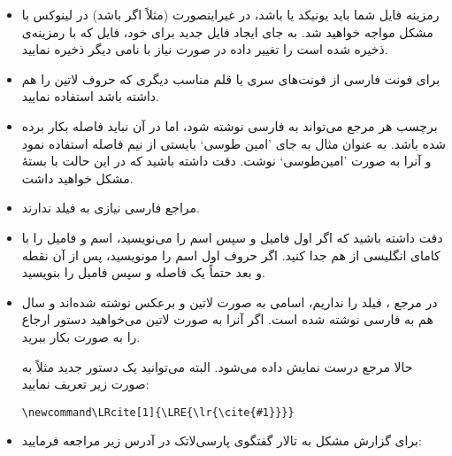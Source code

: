 \documentclass{article}
\theoremstyle{plain}\newtheorem{question}{پرسش}
\begin{document}
\begin{itemize}
\item رمزینه فایل  شما باید یونیکد یا  باشد، در غیراینصورت (مثلاً اگر   باشد) در لینوکس با مشکل مواجه خواهید شد. به جای ایجاد فایل  جدید برای خود،  فایل  که با رمزینه‌ی  ذخیره شده است را تغییر داده در صورت نیاز با نامی دیگر ذخیره نمایید. 
\item برای فونت فارسی از فونت‌های سری  یا قلم مناسب دیگری که حروف لاتین را هم داشته باشد استفاده نمایید.
\item برچسب‌ هر مرجع می‌تواند به فارسی نوشته شود، اما در آن نباید فاصله بکار برده شده باشد. 
به عنوان مثال به جای 'امین طوسی` بایستی از نیم فاصله استفاده نمود و آنرا به صورت 'امین‌طوسی` نوشت. دقت داشته باشید که در این حالت با بستهٔ  مشکل خواهید داشت.
\item مراجع فارسی نیازی به فیلد  ندارند.
\item دقت داشته باشید که اگر اول فامیل و سپس اسم را می‌نویسید، اسم و فامیل را با کامای انگلیسی از هم جدا کنید. اگر حروف اول اسم را مونویسید، پس از آن نقطه و بعد حتماً یک فاصله و سپس فامیل را بنویسید.
\item در مرجع \cite{Baker02limits}،  فیلد  را نداریم، اسامی به صورت لاتین و برعکس نوشته شده‌اند و سال هم به فارسی نوشته شده است. اگر آنرا به صورت لاتین می‌خواهید دستور ارجاع را به صورت  بکار ببرید.

 حالا مرجع  درست نمایش داده می‌شود. البته می‌توانید یک دستور جدید مثلاً به صورت زیر تعریف نمایید:
\begin{latin}
\begin{verbatim}
\newcommand\LRcite[1]{\LRE{\lr{\cite{#1}}}}
\end{verbatim}
\end{latin}

\item  برای گزارش مشکل به تالار گفتگوی پارسی‌لاتک  در آدرس زیر مراجعه فرمایید:\\  \begin{latin}\end{latin}

\end{itemize}
\end{document}
